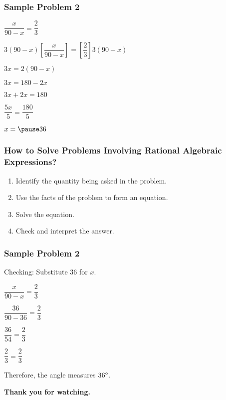 \documentclass[14pt]{beamer}
\begin{document}
    \begin{frame}
    	\frametitle{Sample Problem 2}
    	$ \dfrac{x}{90 - x} = \dfrac{2}{3} $
    	
    	\vone $ 3(90-x)\left[ \dfrac{x}{90 - x} \right] =  \left[\dfrac{2}{3} \right] 3(90-x) $
    	
    	\vspace{0.5em} $ 3x  = 2(90 - x) $
    	
    	 \vspace{0.5em} $ 3x   = 180 - 2x $
    	
    	 \vspace{0.5em} $ 3x + 2x   = 180 $
    	
    	 \vspace{0.5em} $ \dfrac{5x}{5}   = \dfrac{180}{5} $
    	 
    	 \pause \vone $ x = \pause 36 $
    \end{frame}

    \begin{frame}
    	\frametitle{How to Solve Problems Involving Rational Algebraic Expressions?}
    	\begin{enumerate}
    		\item Identify the quantity being asked in the problem.
    		\item Use the facts of the problem to form an equation.
    		\item Solve the equation.
    		\item Check and interpret the answer.
    	\end{enumerate}
    \end{frame}

    \begin{frame}
    	\frametitle{Sample Problem 2}
    	Checking: Substitute $ 36 $ for $ x $.
    	
    	\vone
    	$ \dfrac{x}{90 - x} = \dfrac{2}{3} $
    	
        \pause \vhalf $ \dfrac{36}{90 - 36} = \dfrac{2}{3} $

        \pause \vhalf $ \dfrac{36}{54} = \dfrac{2}{3} $
            	
    	\pause \vhalf $ \dfrac{2}{3} = \dfrac{2}{3} $ \pause \redcheck
    	
    	\pause \vone Therefore, the angle measures $ 36 \degree $.
    \end{frame}

    \begin{frame}
    	\begin{center}
    		\textbf{\LARGE Thank you for watching.}
    	\end{center}
    \end{frame}
	
\end{document}

